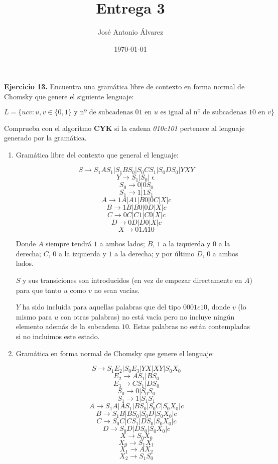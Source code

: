 \documentclass[11pt,a4paper]{article}
\title{Entrega 3}
\author{José Antonio Álvarez}
\date{\today}
\let\epsilon\upvarepsilon
\begin{document}
\maketitle

\textbf{Ejercicio 13.} Encuentra una gramática libre de contexto en forma normal de Chomsky que genere el siguiente lenguaje:

$$ L = \{ucv : u, v \in \{0, 1\} \text{ y nº de subcadenas } 01 \text{ en } u \text{ es igual al nº de subcadenas } 10 \text{ en } v\} $$

Comprueba con el algoritmo \textbf{CYK} si la cadena \emph{010c101} pertenece al lenguaje generado por la gramática.

\begin {enumerate} 

\item Gramática libre del contexto que general el lenguaje:
	
$$ S \rightarrow S_1AS_1 | S_1BS_0 | S_0CS_1 | S_0DS_0 | YXY $$
$$ Y \rightarrow S_1 | S_0 | \epsilon $$
$$ S_0 \rightarrow 0 | 0S_0$$
$$ S_1 \rightarrow 1 | 1S_1$$
$$ A \rightarrow 1A | A1 | B0 | 0C | X | c $$
$$ B \rightarrow 1B | B0 | 0D | X | c $$
$$ C \rightarrow 0C | C1 | C0 | X | c $$
$$ D \rightarrow 0D | D0 | X | c $$
$$ X \rightarrow 01A10 $$

Donde $A$ siempre tendrá $1$ a ambos lados; $B$, $1$ a la izquierda y $0$ a la derecha; $C$, $0$ a la izquierda y $1$ a la derecha; y por último $D$, $0$ a ambos lados.

$S$ y sus transiciones son introducidos (en vez de empezar directamente en $A$) para que tanto $u$ como $v$ no sean vacías.

$Y$ ha sido incluida para aquellas palabras que del tipo $0001c10$, donde $v$ (lo mismo para $u$ con otras palabras) no está vacía pero no incluye ningún elemento además de la subcadena $10$. Estas palabras no están contempladas si no incluimos este estado.

\item Gramática en forma normal de Chomsky que genere el lenguaje:

$$ S \rightarrow S_1E_2 | S_0E_3 | YX | XY | S_0X_0$$
$$ E_2 \rightarrow AS_1 | BS_0 $$
$$ E_3 \rightarrow CS_1 | DS_0 $$
$$ S_0 \rightarrow 0 | S_0S_0$$
$$ S_1 \rightarrow 1 | S_1S_1$$
$$ A \rightarrow S_1A | AS_1 | BS_0 | S_0C | S_0X_0 | c $$
$$ B \rightarrow S_1B | BS_0 | S_0D | S_0X_0 | c $$
$$ C \rightarrow S_0C | CS_1 | DS_0 | S_0X_0 | c $$
$$ D \rightarrow S_0D | DS_0 | S_0X_0 | c $$
$$ X \rightarrow S_0X_0$$
$$ X_0 \rightarrow S_1X_1$$
$$ X_1 \rightarrow AX_2$$
$$ X_2 \rightarrow S_1S_0$$


\end{enumerate}
\end{document}

